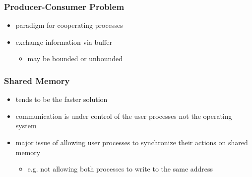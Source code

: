 \documentclass[11pt]{article}
\begin{document}
\subsubsection{Producer-Consumer Problem}
\label{sec:org51dea55}
\begin{itemize}
\item paradigm for cooperating processes
\item exchange information via buffer
\begin{itemize}
\item may be bounded or unbounded
\end{itemize}
\end{itemize}
\subsubsection{Shared Memory}
\label{sec:orgb8769b8}
\begin{itemize}
\item tends to be the faster solution
\item communication is under control of the user processes not the operating system
\item major issue of allowing user processes to synchronize their actions on shared memory
\begin{itemize}
\item e.g. not allowing both processes to write to the same address
\end{itemize}
\end{itemize}
\end{document}

